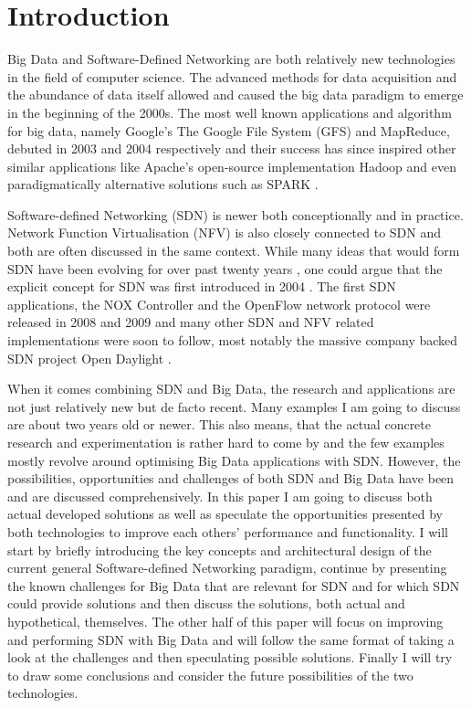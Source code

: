\documentclass{acm_proc_article-sp}
\begin{document}


\section{Introduction}
Big Data and Software-Defined Networking are both relatively new technologies in the field of computer science. The advanced methods for data acquisition and the abundance of data itself allowed and caused the big data paradigm to emerge in the beginning of the 2000s. The most well known applications and algorithm for big data, namely Google's The Google File System (GFS) and MapReduce, debuted in 2003 and 2004 respectively \cite{Ghemawat:2003:GFS:1165389.945450,Dean:2008:MSD:1327452.1327492} and their success has since inspired other similar applications like Apache's open-source implementation Hadoop \cite{Hadoop} and even paradigmatically alternative solutions such as SPARK \cite{Spark}.

Software-defined Networking (SDN) is newer both conceptionally and in practice. Network Function Virtualisation (NFV) is also closely connected to SDN and both are often discussed in the same context. While many ideas that would form SDN have been evolving for over past twenty years \cite{Feamster:2013:RS:2559899.2560327}, one could argue that the explicit concept for SDN was first introduced in 2004 \cite{robert2012system}. The first SDN applications, the NOX Controller \cite{NOX} and the OpenFlow network protocol \cite{McKeown-CCR2008}  were released in 2008 and 2009 and many other SDN and NFV related implementations were soon to follow, most notably the massive company backed SDN project Open Daylight \cite{ODL}.

When it comes combining SDN and Big Data, the research and applications are not just relatively new but de facto recent. Many examples I am going to discuss are about two years old or newer. This also means, that the actual concrete research and experimentation is rather hard to come by and the few examples mostly revolve around optimising Big Data applications with SDN. However, the possibilities, opportunities and challenges of both SDN and Big Data have been and are discussed comprehensively. In this paper I am going to discuss both actual developed solutions as well as speculate the opportunities presented by both technologies to improve each others' performance and functionality. I will start by briefly introducing the key concepts and architectural design of the current general Software-defined Networking paradigm, continue by presenting the known challenges for Big Data that are relevant for SDN and for which SDN could provide solutions and then discuss the solutions, both actual and hypothetical, themselves. The other half of this paper will focus on improving and performing SDN with Big Data and will follow the same format of taking a look at the challenges and then speculating possible solutions. Finally I will try to draw some conclusions and consider the future possibilities of the two technologies. 
\end{document}
